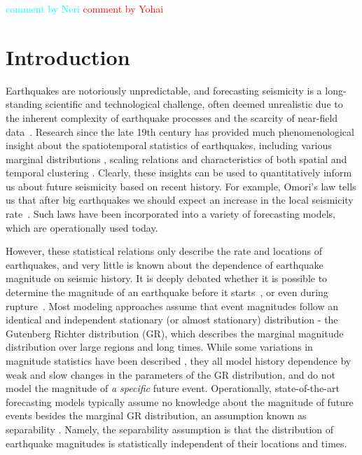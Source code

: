 \documentclass[pdflatex]{sn-jnl}
\newcommand{\yohai}[1]{{\textcolor{red}{#1}}}
\newcommand{\neri}[1]{{\textcolor{cyan}{#1}}}
\begin{document}
\maketitle

\neri{comment by Neri} \newline
\yohai{comment by Yohai}


\section{Introduction} \label{sec:introduction}
Earthquakes are notoriously unpredictable, and forecasting seismicity is a long-standing scientific and technological challenge, often deemed unrealistic due to the inherent complexity of earthquake processes and the scarcity of near-field data~\cite{bernard_earthquake_1999, geller_earthquakes_1997}. 
Research since the late 19th century has provided much phenomenological insight about the spatiotemporal statistics of earthquakes, including various marginal distributions \cite{gutenberg_frequency_1944, kagan_seismic_2002}, scaling relations \cite{bak_earthquakes_1989, dascher-cousineau_what_2020, kagan_aftershock_2002, utsu_centenary_1995} and characteristics of both spatial and temporal clustering \cite{omori_after-shocks_1894, kagan_short-term_2004, ben-zion_localization_2020, devries_deep_2018, king_static_1994}. Clearly, these insights can be used to quantitatively inform us about future seismicity based on recent history. For example, Omori's law tells us that after big earthquakes we should expect an increase in the local seismicity rate~\cite{omori_after-shocks_1894}. Such laws have been incorporated into a variety of forecasting models, which are operationally used today\cite{ogata_statistical_1988, hardebeck_aftershock_2024, jordan_operational_2011, stirling_national_2012}.

However, these statistical relations only describe the rate and locations of earthquakes, and very little is known about the dependence of earthquake magnitude on seismic history.
It is deeply debated whether it is possible to determine the magnitude of an earthquake before it starts~\cite{kagan_seismic_2002, ogata_exploring_2018}, or even during rupture~\cite{ellsworth_seismic_1995, meier_evidence_2016}.
Most modeling approaches assume that event magnitudes follow an identical and independent stationary (or almost stationary) distribution - the Gutenberg Richter distribution (GR), which describes the marginal magnitude distribution over large regions and long times. 
While some variations in magnitude statistics have been described \cite{gulia_real-time_2019, nandan_magnitude_2019}, they all model history dependence by weak and slow changes in the parameters of the GR distribution, and do not model the magnitude of \textit{a specific} future event. Operationally, state-of-the-art forecasting models typically assume no knowledge about the magnitude of future events besides the marginal GR distribution, an assumption known as separability \cite{schoenberg_testing_2004}. Namely, the separability assumption is that the distribution of earthquake magnitudes is statistically independent of their locations and times.
\end{document}
